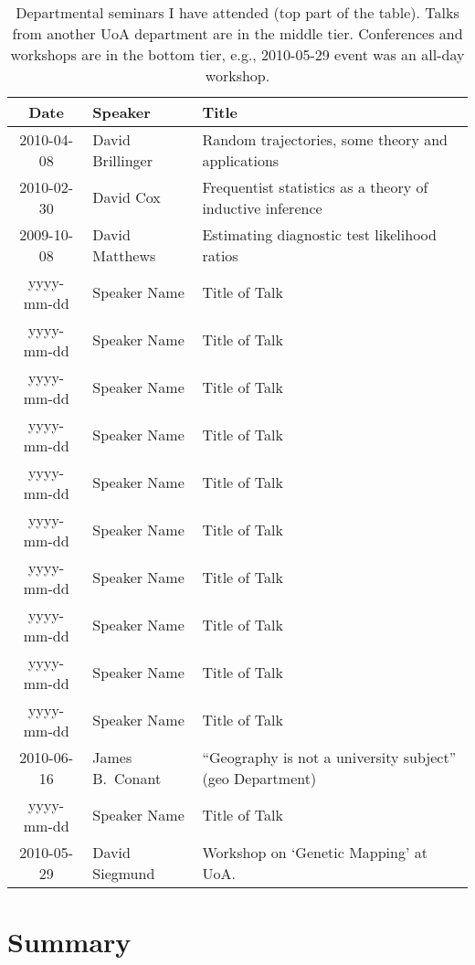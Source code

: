 \documentclass[12pt,a4paper]{article}
\begin{document}
\begin{table}[hh]
\caption{
Departmental seminars I have attended (top part of the table).
Talks from another UoA department are in the middle tier.
Conferences and workshops are in the bottom tier,
e.g., 2010-05-29 event was an all-day workshop.
}
\centering
\ ~~~~ \\
\label{tab:seminars}
\begin{tabular}{|c|l|l|}
\hline
Date & Speaker & Title \\
\hline
2010-04-08 & David Brillinger &
Random trajectories, some theory and applications \\
%
2010-02-30 & David Cox &
Frequentist statistics as a theory of inductive inference \\
%
2009-10-08 & David Matthews &
Estimating diagnostic test likelihood ratios \\
%
yyyy-mm-dd & Speaker Name &
Title of Talk \\
%
yyyy-mm-dd & Speaker Name &
Title of Talk \\
%
yyyy-mm-dd & Speaker Name &
Title of Talk \\
%
yyyy-mm-dd & Speaker Name &
Title of Talk \\
%
yyyy-mm-dd & Speaker Name &
Title of Talk \\
%
yyyy-mm-dd & Speaker Name &
Title of Talk \\
%
yyyy-mm-dd & Speaker Name &
Title of Talk \\
%
yyyy-mm-dd & Speaker Name &
Title of Talk \\
%
yyyy-mm-dd & Speaker Name &
Title of Talk \\
%
yyyy-mm-dd & Speaker Name &
Title of Talk \\
%
\hline
2010-06-16 & James B.~Conant &
``Geography is not a university subject'' (geo Department) \\
%
yyyy-mm-dd & Speaker Name &
Title of Talk \\
\hline
2010-05-29 & David Siegmund &
Workshop on `Genetic Mapping' at UoA. \\
%
\hline
\end{tabular}
\end{table}




\section{Summary}
\end{document}
